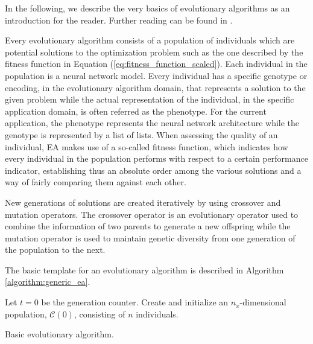\documentclass[preprint,12pt]{elsarticle}%
\begin{document}
In the following, we describe the very basics of evolutionary algorithms as an introduction for the reader. Further reading can be found in \cite{Engelbrecht2007,Ebehart2007,Sumathi2010}. 

Every evolutionary algorithm consists of a population of individuals which are potential solutions to the optimization problem such as the one described by the fitness function in Equation (\ref{eq:fitness_function_scaled}). Each individual in the population is a neural network model. Every individual has a specific genotype or encoding, in the evolutionary algorithm domain, that represents a solution to the given problem while the actual representation of the individual, in the specific application domain, is often referred as the phenotype. For the current application, the phenotype represents the neural network architecture while the genotype is represented by a list of lists. When assessing the quality of an individual, EA makes use of a so-called fitness function, which indicates how every individual in the population performs with respect to a certain performance indicator, establishing thus an absolute order among the various solutions and a way of fairly comparing them against each other. 

New generations of solutions are created iteratively by using crossover and mutation operators. The crossover operator is an evolutionary operator used to combine the information of two parents to generate a new offspring while the mutation operator is used to maintain genetic diversity from one generation of the population to the next.

The basic template for an evolutionary algorithm is described in Algorithm \ref{algorithm:generic_ea}.

\begin{algorithm}[H]
\SetAlgoLined
{}


\BlankLine

Let $t = 0$ be the generation counter.
Create and initialize an $n_x$-dimensional population, $\mathcal{C}(0)$, consisting of $n$ individuals.


\caption{Basic evolutionary algorithm.}
\label{algorithm:generic_ea}
\end{algorithm}
\end{document}
